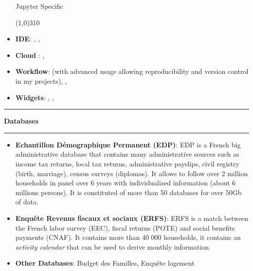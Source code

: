 \documentclass[a4paper,11pt]{article} %
\newcommand{\myhref}[3][blue]{\href{#2}{\color{#1}{#3}}}%
\newcommand{\titre}[1]{%
	\begin{center}
	\rule{\textwidth}{1pt}
	\par\vspace{0.1cm}
        \textbf{\large #1}
	\par\rule{\textwidth}{1pt}
	\end{center}
	}
\begin{document}
\begin{itemize}
 
Jupyter Specific
 \vspace{-0.7cm}
 \begin{flushleft}
\line(1,0){310}
\end{flushleft}
 \vspace{-0.6cm}
 \item \textbf{IDE}: \myhref[black-gray]{https://jupyter.org}{Jupyter Notebook}, \myhref[black-gray]{https://jupyter.org}{Jupyter Lab}, \myhref[black-gray]{https://nteract.io}{nteract}
  \item \textbf{Cloud }: \myhref[black-gray]{https://mybinder.org}{Binder}, \myhref[black-gray]{https://colab.research.google.com/}{Google Colab}
  \item \textbf{Workflow}: \myhref[black-gray]{https://nbconvert.readthedocs.io/en/latest/index.html}{nbconvert} (with advanced usage allowing  reproducibility  and version control in my projects), \myhref[black-gray]{https://github.com/jupyter/nbdime}{nbdime}, \myhref[black-gray]{https://github.com/mwouts/jupytext}{Jupytext}

  \item \textbf{Widgets}: \myhref[black-gray]{http://beakerx.com}{BeakerX}, \myhref[black-gray]{https://jupyter-contrib-nbextensions.readthedocs.io/en/latest/}{jupyter\_contrib\_nbextensions} , \myhref[black-gray]{https://github.com/jupyter-widgets/ipywidgets}{ipywidgets}
 
\end{itemize}

\titre{Databases}

\begin{itemize}
\item \textbf{Echantillon Démographique Permanent (EDP)}:  EDP is a French big administrative database that contains many administrative sources such as income tax returns, local tax returns, administrative payslips, civil registry (birth, marriage), census surveys (diplomas). It allows to follow over 2 million households in panel over 6 years with individualized information (about 6 millions persons). It is constituted of more than 50 databases for over 50Gb of data.
\item \textbf{Enquête Revenus fiscaux et sociaux (ERFS)}:  ERFS is a match between the French labor survey (EEC), fiscal returns (POTE) and social benefits payments (CNAF). It contains more than 40 000 households, it contains an \emph{activity calendar} that can be used to derive monthly information.

\item \textbf{Other Databases}:  Budget des Familles, Enquête logement
\end{itemize}
\newpage
\end{document}
